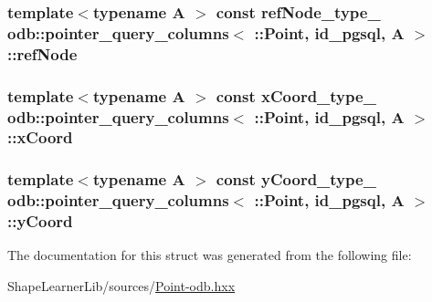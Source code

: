 \subsubsection[{ref\+Node}]{\setlength{\rightskip}{0pt plus 5cm}template$<$typename A $>$ const {\bf ref\+Node\+\_\+type\+\_\+} odb\+::pointer\+\_\+query\+\_\+columns$<$ \+::{\bf Point}, id\+\_\+pgsql, A $>$\+::ref\+Node\hspace{0.3cm}{\ttfamily [static]}}\label{structodb_1_1pointer__query__columns_3_01_1_1_point_00_01id__pgsql_00_01_a_01_4_add815ce437f5608ada7a8d5ea5c63725}
\hypertarget{structodb_1_1pointer__query__columns_3_01_1_1_point_00_01id__pgsql_00_01_a_01_4_aad1f54946769f87dd3858d4709b8ca63}{}
\subsubsection[{x\+Coord}]{\setlength{\rightskip}{0pt plus 5cm}template$<$typename A $>$ const {\bf x\+Coord\+\_\+type\+\_\+} odb\+::pointer\+\_\+query\+\_\+columns$<$ \+::{\bf Point}, id\+\_\+pgsql, A $>$\+::x\+Coord\hspace{0.3cm}{\ttfamily [static]}}\label{structodb_1_1pointer__query__columns_3_01_1_1_point_00_01id__pgsql_00_01_a_01_4_aad1f54946769f87dd3858d4709b8ca63}
\hypertarget{structodb_1_1pointer__query__columns_3_01_1_1_point_00_01id__pgsql_00_01_a_01_4_ad6408b0274a7d0c07a1143132913fe97}{}
\subsubsection[{y\+Coord}]{\setlength{\rightskip}{0pt plus 5cm}template$<$typename A $>$ const {\bf y\+Coord\+\_\+type\+\_\+} odb\+::pointer\+\_\+query\+\_\+columns$<$ \+::{\bf Point}, id\+\_\+pgsql, A $>$\+::y\+Coord\hspace{0.3cm}{\ttfamily [static]}}\label{structodb_1_1pointer__query__columns_3_01_1_1_point_00_01id__pgsql_00_01_a_01_4_ad6408b0274a7d0c07a1143132913fe97}


The documentation for this struct was generated from the following file\+:\begin{DoxyCompactItemize}
\item 
Shape\+Learner\+Lib/sources/\hyperlink{_point-odb_8hxx}{Point-\/odb.\+hxx}\end{DoxyCompactItemize}

